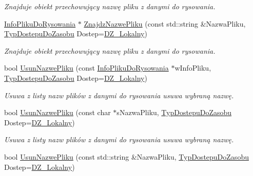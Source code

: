 \begin{DoxyCompactItemize}
\begin{DoxyCompactList}\small\item\em Znajduje obiekt przechowujący nazwę pliku z danymi do rysowania. \end{DoxyCompactList}\item 
\mbox{\hyperlink{class_pz_g_1_1_info_pliku_do_rysowania}{Info\+Pliku\+Do\+Rysowania}} $\ast$ \mbox{\hyperlink{class_pz_g_1_1_lacze_do_g_n_u_plota_a80edeb736c353cf64715f16e6a81ee1b}{Znajdz\+Nazwe\+Pliku}} (const std\+::string \&Nazwa\+Pliku, \mbox{\hyperlink{namespace_pz_g_af74528dea7061dcb07cf44f315703cf4}{Typ\+Dostepu\+Do\+Zasobu}} Dostep=\mbox{\hyperlink{namespace_pz_g_af74528dea7061dcb07cf44f315703cf4ab239a07233614b519b0f2f5ca8af7826}{D\+Z\+\_\+\+Lokalny}})
\begin{DoxyCompactList}\small\item\em Znajduje obiekt przechowujący nazwę pliku z danymi do rysowania. \end{DoxyCompactList}\item 
bool \mbox{\hyperlink{class_pz_g_1_1_lacze_do_g_n_u_plota_a7fa4e775e1aee74869fae174c567c2a6}{Usun\+Nazwe\+Pliku}} (const \mbox{\hyperlink{class_pz_g_1_1_info_pliku_do_rysowania}{Info\+Pliku\+Do\+Rysowania}} $\ast$w\+Info\+Pliku, \mbox{\hyperlink{namespace_pz_g_af74528dea7061dcb07cf44f315703cf4}{Typ\+Dostepu\+Do\+Zasobu}} Dostep=\mbox{\hyperlink{namespace_pz_g_af74528dea7061dcb07cf44f315703cf4ab239a07233614b519b0f2f5ca8af7826}{D\+Z\+\_\+\+Lokalny}})
\begin{DoxyCompactList}\small\item\em Usuwa z listy nazw plików z danymi do rysowania usuwa wybraną nazwę. \end{DoxyCompactList}\item 
bool \mbox{\hyperlink{class_pz_g_1_1_lacze_do_g_n_u_plota_a9f31ec3f418db5df94e2b24096dfc64d}{Usun\+Nazwe\+Pliku}} (const char $\ast$s\+Nazwa\+Pliku, \mbox{\hyperlink{namespace_pz_g_af74528dea7061dcb07cf44f315703cf4}{Typ\+Dostepu\+Do\+Zasobu}} Dostep=\mbox{\hyperlink{namespace_pz_g_af74528dea7061dcb07cf44f315703cf4ab239a07233614b519b0f2f5ca8af7826}{D\+Z\+\_\+\+Lokalny}})
\begin{DoxyCompactList}\small\item\em Usuwa z listy nazw plików z danymi do rysowania usuwa wybraną nazwę. \end{DoxyCompactList}\item 
bool \mbox{\hyperlink{class_pz_g_1_1_lacze_do_g_n_u_plota_a29f5e5b048a278b4c032b6d9275d0826}{Usun\+Nazwe\+Pliku}} (const std\+::string \&Nazwa\+Pliku, \mbox{\hyperlink{namespace_pz_g_af74528dea7061dcb07cf44f315703cf4}{Typ\+Dostepu\+Do\+Zasobu}} Dostep=\mbox{\hyperlink{namespace_pz_g_af74528dea7061dcb07cf44f315703cf4ab239a07233614b519b0f2f5ca8af7826}{D\+Z\+\_\+\+Lokalny}})

\end{DoxyCompactItemize}
